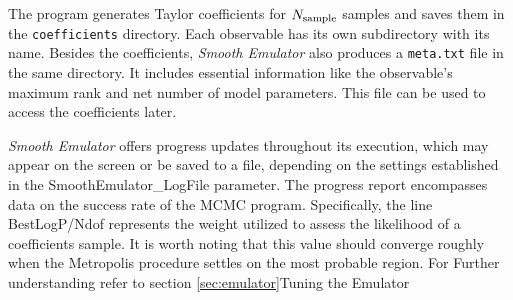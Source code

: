 \documentclass[UserManual.tex]{subfiles}
\begin{document}
The program generates Taylor coefficients for $N_{\rm sample}$ samples and saves them in the {\tt coefficients} directory. Each observable has its own subdirectory with its name. Besides the coefficients, {\it Smooth Emulator} also produces a {\tt meta.txt} file in the same directory. It includes essential information like the observable's maximum rank and net number of model parameters. This file can be used to access the coefficients later.

{\it Smooth Emulator} offers progress updates throughout its execution, which may appear on the screen or be saved to a file, depending on the settings established in the SmoothEmulator\_LogFile parameter. The progress report encompasses data on the success rate of the MCMC program. Specifically, the line BestLogP/Ndof represents the weight utilized to assess the likelihood of a coefficients sample. It is worth noting that this value should converge roughly when the Metropolis procedure settles on the most probable region. For Further understanding refer to section \ref{sec:emulator}{Tuning the Emulator}
\end{document}
